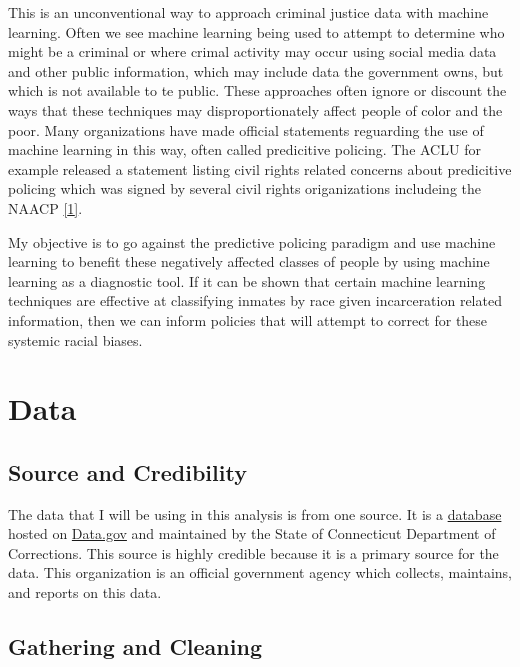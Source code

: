\documentclass[11pt]{article}
\begin{document}
This is an unconventional way to approach criminal justice data with
machine learning. Often we see machine learning being used to attempt to
determine who might be a criminal or where crimal activity may occur
using social media data and other public information, which may include
data the government owns, but which is not available to te public. These
approaches often ignore or discount the ways that these techniques may
disproportionately affect people of color and the poor. Many
organizations have made official statements reguarding the use of
machine learning in this way, often called predicitive policing. The
ACLU for example released a statement listing civil rights related
concerns about predicitive policing which was signed by several civil
rights origanizations includeing the NAACP
\href{https://www.aclu.org/other/statement-concern-about-predictive-policing-aclu-and-16-civil-rights-privacy-racial-justice}{{[}1{]}}.

My objective is to go against the predictive policing paradigm and use
machine learning to benefit these negatively affected classes of people
by using machine learning as a diagnostic tool. If it can be shown that
certain machine learning techniques are effective at classifying inmates
by race given incarceration related information, then we can inform
policies that will attempt to correct for these systemic racial biases.

    \hypertarget{data}{%
\section{Data}\label{data}}

\hypertarget{source-and-credibility}{%
\subsection{Source and Credibility}\label{source-and-credibility}}

The data that I will be using in this analysis is from one source. It is
a
\href{https://catalog.data.gov/dataset/sentenced-inmates-in-correctional-facilities}{database}
hosted on \href{https://www.data.gov}{Data.gov} and maintained by the
State of Connecticut Department of Corrections. This source is highly
credible because it is a primary source for the data. This organization
is an official government agency which collects, maintains, and reports
on this data.

\hypertarget{gathering-and-cleaning}{%
\subsection{Gathering and Cleaning}\label{gathering-and-cleaning}}
\end{document}
